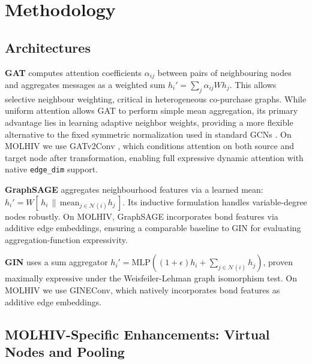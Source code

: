 \documentclass[conference]{IEEEtran}
\begin{document}
\section{Methodology}

\subsection{Architectures}

\textbf{GAT} \cite{velickovic2018} computes attention coefficients $\alpha_{ij}$ between pairs of neighbouring nodes and aggregates messages as a weighted sum $h_i' = \sum_j \alpha_{ij} W h_j$. This allows selective neighbour weighting, critical in heterogeneous co-purchase graphs. While uniform attention allows GAT to perform simple mean aggregation, its primary advantage lies in learning adaptive neighbor weights, providing a more flexible alternative to the fixed symmetric normalization used in standard GCNs \cite{kipf2017}. On MOLHIV we use GATv2Conv \cite{brody2022}, which conditions attention on both source and target node after transformation, enabling full expressive dynamic attention with native \texttt{edge\_dim} support.

\textbf{GraphSAGE} \cite{hamilton2017} aggregates neighbourhood features via a learned mean: $h_i' = W[\,h_i \,\|\, \text{mean}_{j \in \mathcal{N}(i)} h_j\,]$. Its inductive formulation handles variable-degree nodes robustly. On MOLHIV, GraphSAGE incorporates bond features via additive edge embeddings, ensuring a comparable baseline to GIN for evaluating aggregation-function expressivity.

\textbf{GIN} \cite{xu2019} uses a sum aggregator $h_i' = \text{MLP}((1+\epsilon)h_i + \sum_{j \in \mathcal{N}(i)} h_j)$, proven maximally expressive under the Weisfeiler-Lehman graph isomorphism test. On MOLHIV we use GINEConv, which natively incorporates bond features as additive edge embeddings.

\subsection{MOLHIV-Specific Enhancements: Virtual Nodes and Pooling}
\end{document}
